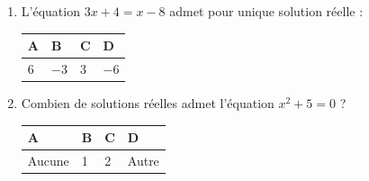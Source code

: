 \documentclass[oneside,12pt]{exam}          %
\begin{document}
\begin{enumerate}[label=\underline{Question \no\arabic*} :  , leftmargin=* , itemsep=5mm]
		

	\item L'équation $3x+4=x-8$ admet pour unique solution réelle :
	
		\hspace{\linewidth-\textwidth}
		\renewcommand{\arraystretch}{1.5}
		\begin{tabular}{| P{0.22\textwidth} | P{0.22\textwidth} | P{0.22\textwidth} | P{0.22\textwidth} |} \hline
			A & B & C & D \\ \hline
			$6$ & $-3$ & $3$ & $-6$ \\ \hline
		\end{tabular}
		
		

	\item Combien de solutions réelles admet l'équation $x^2 + 5 = 0$ ?
	
		\hspace{\linewidth-\textwidth}
		\renewcommand{\arraystretch}{1.5}
		\begin{tabular}{| P{0.22\textwidth} | P{0.22\textwidth} | P{0.22\textwidth} | P{0.22\textwidth} |} \hline
			A & B & C & D \\ \hline
			Aucune & 1 & 2 & Autre \\ \hline
		\end{tabular}



\newpage
\end{enumerate}
\end{document}
